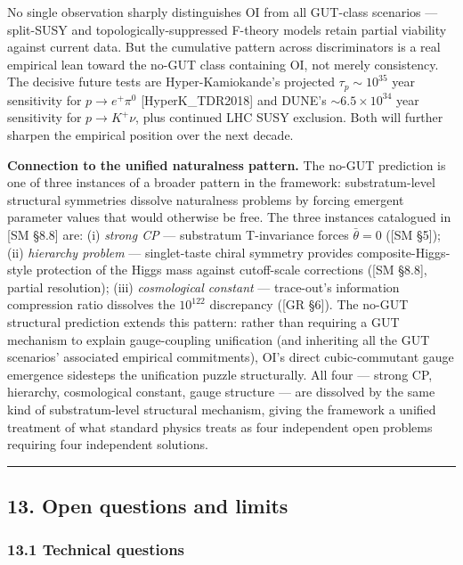 \documentclass[
]{article}
\begin{document}
No single observation sharply distinguishes OI from all GUT-class
scenarios --- split-SUSY and topologically-suppressed F-theory models
retain partial viability against current data. But the cumulative
pattern across discriminators is a real empirical lean toward the no-GUT
class containing OI, not merely consistency. The decisive future tests
are Hyper-Kamiokande's projected \(\tau_p \sim 10^{35}\) year
sensitivity for \(p \to e^+\pi^0\) {[}HyperK\_TDR2018{]} and DUNE's
\(\sim 6.5 \times 10^{34}\) year sensitivity for \(p \to K^+\nu\), plus
continued LHC SUSY exclusion. Both will further sharpen the empirical
position over the next decade.

\textbf{Connection to the unified naturalness pattern.} The no-GUT
prediction is one of three instances of a broader pattern in the
framework: substratum-level structural symmetries dissolve naturalness
problems by forcing emergent parameter values that would otherwise be
free. The three instances catalogued in {[}SM §8.8{]} are: (i)
\emph{strong CP} --- substratum T-invariance forces \(\bar\theta = 0\)
({[}SM §5{]}); (ii) \emph{hierarchy problem} --- singlet-taste chiral
symmetry provides composite-Higgs-style protection of the Higgs mass
against cutoff-scale corrections ({[}SM §8.8{]}, partial resolution);
(iii) \emph{cosmological constant} --- trace-out's information
compression ratio dissolves the \(10^{122}\) discrepancy ({[}GR §6{]}).
The no-GUT structural prediction extends this pattern: rather than
requiring a GUT mechanism to explain gauge-coupling unification (and
inheriting all the GUT scenarios' associated empirical commitments),
OI's direct cubic-commutant gauge emergence sidesteps the unification
puzzle structurally. All four --- strong CP, hierarchy, cosmological
constant, gauge structure --- are dissolved by the same kind of
substratum-level structural mechanism, giving the framework a unified
treatment of what standard physics treats as four independent open
problems requiring four independent solutions.

\begin{center}\rule{0.5\linewidth}{0.5pt}\end{center}

\hypertarget{open-questions-and-limits}{%
\subsection{13. Open questions and
limits}\label{open-questions-and-limits}}

\hypertarget{technical-questions}{%
\subsubsection{13.1 Technical questions}\label{technical-questions}}
\end{document}
